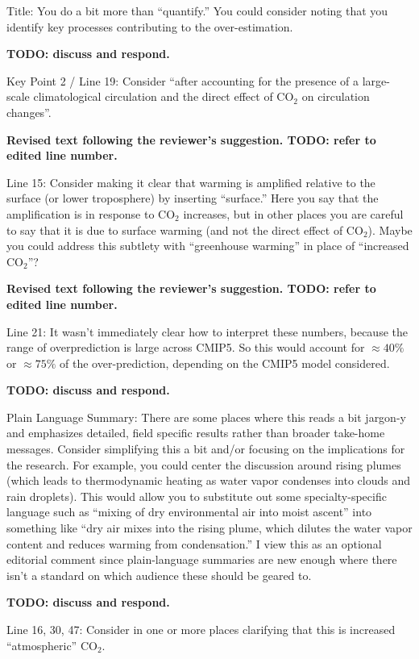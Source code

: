 \documentclass[11pt]{article}
\begin{document}
Title: You do a bit more than ``quantify.'' You could consider noting that you identify key processes contributing to the over-estimation.

\textbf{TODO: discuss and respond.}

Key Point 2 / Line 19: Consider ``after accounting for the presence of a large-scale climatological circulation and the direct effect of CO\(_2\) on circulation changes''.

\textbf{Revised text following the reviewer's suggestion. TODO: refer to edited line number.}

Line 15: Consider making it clear that warming is amplified relative to the surface (or lower troposphere) by inserting ``surface.'' Here you say that the amplification is in response to CO\(_2\) increases, but in other places you are careful to say that it is due to surface warming (and not the direct effect of CO\(_2\)). Maybe you could address this subtlety with ``greenhouse warming'' in place of ``increased CO\(_2\)''?

\textbf{Revised text following the reviewer's suggestion. TODO: refer to edited line number.}

Line 21: It wasn't immediately clear how to interpret these numbers, because the range of overprediction is large across CMIP5. So this would account for \(\approx40\%\) or \(\approx75\%\) of the over-prediction, depending on the CMIP5 model considered.

\textbf{TODO: discuss and respond.}

Plain Language Summary: There are some places where this reads a bit jargon-y and emphasizes detailed, field specific results rather than broader take-home messages. Consider simplifying this a bit and/or focusing on the implications for the research. For example, you could center the discussion around rising plumes (which leads to thermodynamic heating as water vapor condenses into clouds and rain droplets). This would allow you to substitute out some specialty-specific language such as ``mixing of dry environmental air into moist ascent'' into something like ``dry air mixes into the rising plume, which dilutes the water vapor content and reduces warming from condensation.'' I view this as an optional editorial comment since plain-language summaries are new enough where there isn't a standard on which audience these should be geared to.

\textbf{TODO: discuss and respond.}

Line 16, 30, 47: Consider in one or more places clarifying that this is increased ``atmospheric'' CO\(_2\).
\end{document}

